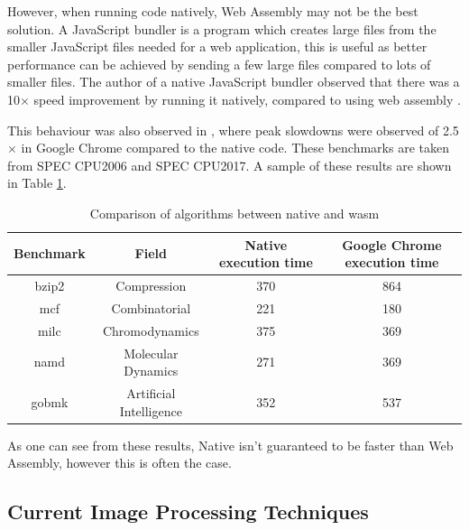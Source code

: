 \documentclass[12pt,a4paper]{article}
\begin{document}
\color{Mulberry}

However, when running code natively, Web Assembly may not be the best solution. A JavaScript bundler is a program which creates large files from the smaller JavaScript files needed for a web application, this is useful as better performance can be achieved by sending a few large files compared to lots of smaller files. The author of a native JavaScript bundler observed that there was a 10$\times$ speed improvement by running it natively, compared to using web assembly \cite{esbuild}.
\color{black}

This behaviour was also observed in \cite{jangda2019not}, where peak slowdowns were observed of 2.5$\times$ in Google Chrome compared to the native code. These benchmarks are taken from SPEC CPU2006 and SPEC CPU2017. A sample of these results are shown in Table \ref{native}.
\begin{table}[H]
    \centering
    \caption{Comparison of algorithms between native and wasm}
    \vspace*{6pt}
    \label{native}
    \begin{tabular}{cccc}\hline\hline
        Benchmark & Field                   & Native execution time & Google Chrome execution time \\ \hline
        bzip2     & Compression             & 370                   & 864                          \\
        mcf       & Combinatorial           & 221                   & 180                          \\
        milc      & Chromodynamics          & 375                   & 369                          \\
        namd      & Molecular Dynamics      & 271                   & 369                          \\
        gobmk     & Artificial Intelligence & 352                   & 537
    \end{tabular}
\end{table}

As one can see from these results, Native isn't guaranteed to be faster than Web Assembly, however this is often the case.



\subsection{Current Image Processing Techniques}
\end{document}
